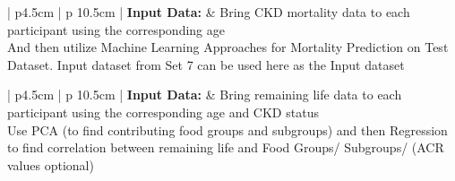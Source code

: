 \begin{table}
\caption{\textbf{Set 8: Experiments using Regression: No aggregated (on age groups) survey data} }
\vspace{0.25cm}
\begin{tabular}{| p{4.5cm}  |  p {10.5cm} | }
\hline
\noindent \textbf{Input Data:} & Bring CKD mortality data to each participant using the corresponding age\\
\hline
{} { { \noindent  And then utilize Machine Learning Approaches for Mortality Prediction on Test Dataset.  Input dataset from Set 7 can be used here as the Input dataset }} \\
\hline
\end{tabular}
\end{table}

\begin{table}
\caption{\textbf{Set 9: Remaining Life for CKD Patients and Food Groups/Subgroups: No aggregated survey data} }
\label{experiment-end}
\vspace{0.25cm}
\begin{tabular}{| p{4.5cm}  |  p {10.5cm} | }
\hline
\noindent \textbf{Input Data:} & {Bring remaining life data to each participant using the corresponding age  and CKD status} \\
\hline
{} { Use PCA (to find contributing food groups and subgroups) and then Regression to find  correlation between remaining life  and Food Groups/ Subgroups/ (ACR values optional)  } \\
\hline
\end{tabular}
\end{table}
